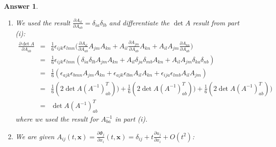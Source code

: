 \documentclass[a4paper]{article}
\newtheorem{ans}{Answer}[section]
\theoremstyle{new}
\begin{document}
\begin{ans}
\begin{enumerate}[label=(\roman*)]
\begin{eqnarray}
Q_{ba}A_{ac}&=&\frac{1}{2\det A}\epsilon_{ajk}\epsilon_{bmn}A_{jm}A_{kn}A_{ac}\nonumber\\&=&\frac{1}{2\det A}\epsilon_{cmn}\det A\epsilon_{bmn}\nonumber\\&=&\frac{1}{2}\epsilon_{mnc}\epsilon_{mnb}\nonumber\\&=&\frac{1}{2}(\delta_{cb}\delta_{nn}-\delta_{cn}\delta_{nb})\nonumber\\&=&\frac{1}{2}(3-1)\delta_{cb}\nonumber\\&=&\delta_{cb}\nonumber
\end{eqnarray}
Hence, $Q_{ba}=A_{ba}^{-1}$ is the inverse of $A$.
\item We used the result $\frac{\partial A_{il}}{\partial A_{ab}}=\delta_{ia}\delta_{lb}$ and differentiate the $\det A$ result from part (i):
\begin{eqnarray}
\frac{\partial\det A}{\partial A_{ab}}&=&\frac{1}{6}\epsilon_{ijk}\epsilon_{lmn}\bigg(\frac{\partial A_{il}}{\partial A_{ab}}A_{jm}A_{kn}+A_{il}\frac{\partial A_{jm}}{\partial A_{ab}}A_{kn}+A_{il}A_{jm}\frac{\partial A_{kn}}{\partial A_{ab}}\bigg)\nonumber\\&=&\frac{1}{6}\epsilon_{ijk}\epsilon_{lmn}(\delta_{ia}\delta_{lb}A_{jm}A_{kn}+A_{il}\delta_{ja}\delta_{mb}A_{kn}+A_{il}A_{jm}\delta_{ka}\delta_{nb})\nonumber\\&=&\frac{1}{6}(\epsilon_{ajk}\epsilon_{bmn}A_{jm}A_{kn}+\epsilon_{ajk}\epsilon_{lbn}A_{il}A_{kn}+\epsilon_{ija}\epsilon_{lmb}A_{il}A_{jm})\nonumber\\&=&\frac{1}{6}(2\det A (A^{-1})_{ab}^T))+\frac{1}{6}(2\det A (A^{-1})_{ab}^T))+\frac{1}{6}(2\det A (A^{-1})_{ab}^T))\nonumber\\&=&\det A (A^{-1})^T_{ab}\nonumber
\end{eqnarray}
where we used the result for $A^{-1}_{ba}$ in part (i).
\item We are given $A_{ij}(t,\mathbf{x})=\frac{\partial\Phi_j}{\partial x_i}(t,\mathbf{x})=\delta_{ij}+t\frac{\partial u_j}{\partial x_i}+O(t^2)$:
\begin{eqnarray}

\end{eqnarray}
\end{enumerate}
\end{ans}
\end{document}
